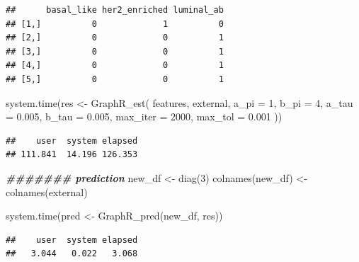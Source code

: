 \documentclass[
]{book}
\newenvironment{Shaded}{\begin{snugshade}}{\end{snugshade}}
\newcommand{\AttributeTok}[1]{\textcolor[rgb]{0.77,0.63,0.00}{#1}}
\newcommand{\DecValTok}[1]{\textcolor[rgb]{0.00,0.00,0.81}{#1}}
\newcommand{\DocumentationTok}[1]{\textcolor[rgb]{0.56,0.35,0.01}{\textbf{\textit{#1}}}}
\newcommand{\FloatTok}[1]{\textcolor[rgb]{0.00,0.00,0.81}{#1}}
\newcommand{\FunctionTok}[1]{\textcolor[rgb]{0.00,0.00,0.00}{#1}}
\newcommand{\NormalTok}[1]{#1}
\newcommand{\OtherTok}[1]{\textcolor[rgb]{0.56,0.35,0.01}{#1}}
\newcommand{\SpecialCharTok}[1]{\textcolor[rgb]{0.00,0.00,0.00}{#1}}
\begin{document}
\begin{Shaded}
\end{Shaded}

\begin{verbatim}
##      basal_like her2_enriched luminal_ab
## [1,]          0             1          0
## [2,]          0             0          1
## [3,]          0             0          1
## [4,]          0             0          1
## [5,]          0             0          1
\end{verbatim}

\begin{Shaded}
\begin{Highlighting}[]
\FunctionTok{system.time}\NormalTok{(res }\OtherTok{\textless{}{-}} \FunctionTok{GraphR\_est}\NormalTok{(}
\NormalTok{  features,}
\NormalTok{  external,}
  \AttributeTok{a\_pi =} \DecValTok{1}\NormalTok{,}
  \AttributeTok{b\_pi =} \DecValTok{4}\NormalTok{,}
  \AttributeTok{a\_tau =} \FloatTok{0.005}\NormalTok{,}
  \AttributeTok{b\_tau =} \FloatTok{0.005}\NormalTok{,}
  \AttributeTok{max\_iter =} \DecValTok{2000}\NormalTok{,}
  \AttributeTok{max\_tol =} \FloatTok{0.001}
\NormalTok{))}
\end{Highlighting}
\end{Shaded}

\begin{verbatim}
##    user  system elapsed 
## 111.841  14.196 126.353
\end{verbatim}

\begin{Shaded}
\begin{Highlighting}[]
\DocumentationTok{\#\#\#\#\#\#\# prediction}
\NormalTok{new\_df }\OtherTok{\textless{}{-}} \FunctionTok{diag}\NormalTok{(}\DecValTok{3}\NormalTok{)}
\FunctionTok{colnames}\NormalTok{(new\_df) }\OtherTok{\textless{}{-}} \FunctionTok{colnames}\NormalTok{(external)}

\FunctionTok{system.time}\NormalTok{(pred }\OtherTok{\textless{}{-}} \FunctionTok{GraphR\_pred}\NormalTok{(new\_df, res))}
\end{Highlighting}
\end{Shaded}

\begin{verbatim}
##    user  system elapsed 
##   3.044   0.022   3.068
\end{verbatim}
\end{document}
